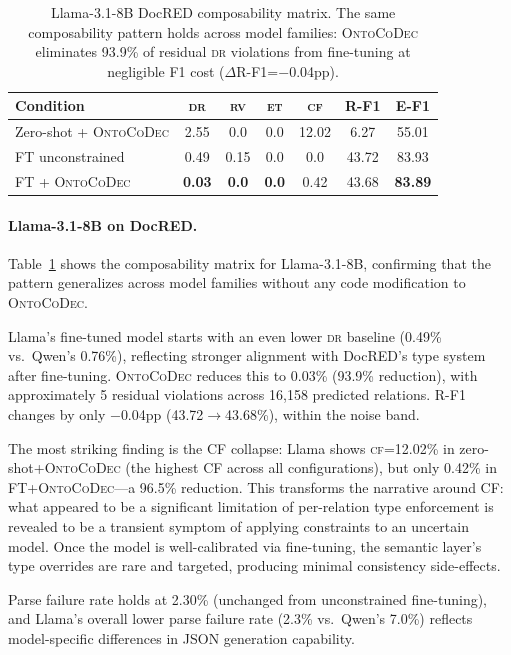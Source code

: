 \documentclass[11pt,a4paper]{article}
\newcommand{\sys}{\textsc{OntoCoDec}}
\newcommand{\DR}{\textsc{dr}}
\newcommand{\RV}{\textsc{rv}}
\newcommand{\ET}{\textsc{et}}
\newcommand{\CF}{\textsc{cf}}
\begin{document}
\begin{table}[t]
\centering
\small
\caption{Llama-3.1-8B DocRED composability matrix. The same composability pattern holds across model families: \sys{} eliminates 93.9\% of residual \DR{} violations from fine-tuning at negligible F1 cost ($\Delta$R-F1=$-$0.04pp).}
\label{tab:llama-composability}
\begin{tabular}{@{}lcccccc@{}}
\toprule
\textbf{Condition} & \textbf{\DR{}} & \textbf{\RV{}} & \textbf{\ET{}} & \textbf{\CF{}} & \textbf{R-F1} & \textbf{E-F1} \\
\midrule
Zero-shot + \sys{} & 2.55 & 0.0 & 0.0 & 12.02 & 6.27 & 55.01 \\
FT unconstrained & 0.49 & 0.15 & 0.0 & 0.0 & 43.72 & 83.93 \\
FT + \sys{} & \textbf{0.03} & \textbf{0.0} & \textbf{0.0} & 0.42 & 43.68 & \textbf{83.89} \\
\bottomrule
\end{tabular}
\end{table}

\paragraph{Llama-3.1-8B on DocRED.}
Table~\ref{tab:llama-composability} shows the composability matrix for Llama-3.1-8B, confirming that the pattern generalizes across model families without any code modification to \sys{}.

Llama's fine-tuned model starts with an even lower \DR{} baseline (0.49\% vs.\ Qwen's 0.76\%), reflecting stronger alignment with DocRED's type system after fine-tuning. \sys{} reduces this to 0.03\% (93.9\% reduction), with approximately 5 residual violations across 16,158 predicted relations. R-F1 changes by only $-$0.04pp (43.72$\to$43.68\%), within the noise band.

The most striking finding is the CF collapse: Llama shows \CF{}=12.02\% in zero-shot+\sys{} (the highest CF across all configurations), but only 0.42\% in FT+\sys{}---a 96.5\% reduction. This transforms the narrative around CF: what appeared to be a significant limitation of per-relation type enforcement is revealed to be a transient symptom of applying constraints to an uncertain model. Once the model is well-calibrated via fine-tuning, the semantic layer's type overrides are rare and targeted, producing minimal consistency side-effects.

Parse failure rate holds at 2.30\% (unchanged from unconstrained fine-tuning), and Llama's overall lower parse failure rate (2.3\% vs.\ Qwen's 7.0\%) reflects model-specific differences in JSON generation capability.
\end{document}
